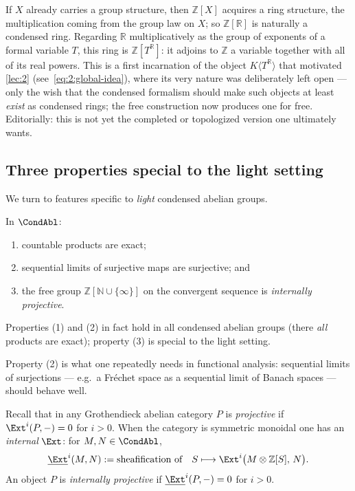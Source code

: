 \begin{remark}
\label{rmk:3:ZG-ring}
If $X$ already carries a group structure, then $\mathbb{Z}[X]$ acquires a ring
structure, the multiplication coming from the group law on $X$; so
$\mathbb{Z}[\mathbb{R}]$ is naturally a condensed ring. Regarding $\mathbb{R}$
multiplicatively as the group of exponents of a formal variable $T$, this ring
is $\mathbb{Z}[T^{\mathbb{R}}]$: it adjoins to $\mathbb{Z}$ a variable together
with all of its real powers. This is a first incarnation of the object
$K\langle T^{\mathbb{R}}\rangle$ that motivated \cref{lec:2}
(see~\eqref{eq:2:global-idea}), where its very nature was deliberately left open
--- only the wish that the condensed formalism should make such objects at least
\emph{exist} as condensed rings; the free construction now produces one for
free. Editorially: this is not yet the completed or topologized version one
ultimately wants.
\end{remark}

\subsection{Three properties special to the light setting}

We turn to features specific to \emph{light} condensed abelian groups.

\begin{theorem}
\label{thm:3:three-properties}
In $\CondAbl$:
\begin{enumerate}
\item countable products are exact;
\item sequential limits of surjective maps are surjective; and
\item the free group $\mathbb{Z}[\mathbb{N}\cup\{\infty\}]$ on the convergent
sequence is \emph{internally projective}.
\end{enumerate}
Properties \textup{(1)} and \textup{(2)} in fact hold in all condensed abelian
groups (there \emph{all} products are exact); property \textup{(3)} is special to
the light setting.
\end{theorem}

Property (2) is what one repeatedly needs in functional analysis: sequential
limits of surjections --- e.g.\ a Fr\'echet space as a sequential limit of Banach
spaces --- should behave well.

\begin{definition}
\label{def:3:internally-projective}
Recall that in any Grothendieck abelian category $P$ is \emph{projective} if
$\Ext^i(P,-)=0$ for $i>0$. When the category is symmetric monoidal one has an
\emph{internal} $\Ext$: for $M,N\in\CondAbl$,
\begin{equation*}
\underline{\Ext}^i(M,N):=\text{sheafification of}\quad
S\longmapsto \Ext^i\bigl(M\otimes\mathbb{Z}[S],\,N\bigr).
\end{equation*}
An object $P$ is \emph{internally projective} if $\underline{\Ext}^i(P,-)=0$ for
$i>0$.
\end{definition}


